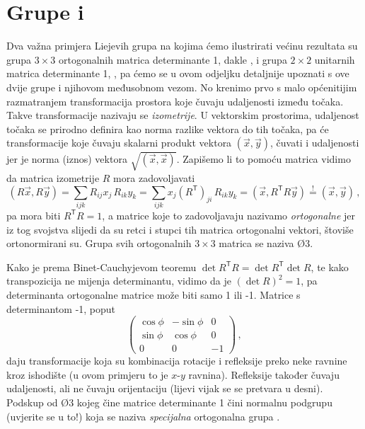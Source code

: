 \section{Grupe  i }
\label{sec:so3su2}

Dva važna primjera Liejevih grupa na kojima  ćemo ilustrirati većinu rezultata
su grupa $3 \times 3$ ortogonalnih matrica determinante 1, dakle ,
i grupa $2 \times 2$ unitarnih matrica determinante 1, , pa ćemo
se u ovom odjeljku detaljnije upoznati s ove dvije grupe i njihovom
međusobnom vezom. No krenimo prvo
s malo općenitijim razmatranjem transformacija prostora koje
čuvaju udaljenosti između točaka.
Takve transformacije nazivaju se \emph{izometrije}. U vektorskim prostorima,
udaljenost točaka se prirodno definira kao norma razlike vektora do tih točaka,
pa će transformacije koje čuvaju skalarni produkt vektora $(\vec{x}, \vec{y})$,
čuvati i udaljenosti jer je norma (iznos) vektora $\sqrt{(\vec{x}, \vec{x})}$.
Zapišemo li to pomoću matrica vidimo da matrica izometrije $R$ mora zadovoljavati
\begin{equation}
    (R\vec{x}, R\vec{y}) = \sum_{ijk} R_{ij}x_{j} \, R_{ik} y_{k} = \sum_{ijk} x_{j} (R^\mathsf{T})_{ji}
    \, R_{ik} y_{k} = (\vec{x}, R^{\mathsf{T}} R \vec{y}) \stackrel{!}{=} (\vec{x}, \vec{y}) \,,
\end{equation}
pa mora biti $R^{\mathsf{T}} R = 1$, a matrice koje to zadovoljavaju
nazivamo \emph{ortogonalne} jer iz tog svojstva slijedi da su retci i stupci
tih matrica ortogonalni vektori, štoviše ortonormirani su. Grupa svih
ortogonalnih $3 \times 3$ matrica se naziva \O{3}.

Kako je prema Binet-Cauchyjevom teoremu $\det R^\mathsf{T} R = \det R^\mathsf{T} \det R$,
te kako transpozicija ne mijenja determinantu, vidimo da je $(\det R)^2 = 1$,
pa determinanta ortogonalne matrice može biti samo 1 ili -1. \label{pag:detO3}
Matrice s determinantom -1, poput 
\begin{equation}
\begin{pmatrix}
\cos\phi & -\sin\phi & 0 \\
\sin\phi & \cos\phi & 0 \\
0 & 0 & -1 \end{pmatrix} \,,
\end{equation}
daju transformacije koja su kombinacija rotacije i refleksije preko
neke ravnine kroz ishodište (u ovom primjeru to je $x$-$y$ ravnina).
Refleksije također čuvaju
udaljenosti, ali ne čuvaju orijentaciju (lijevi vijak se
se pretvara u desni). Podskup od \O{3} kojeg čine
matrice determinante 1 čini normalnu podgrupu (uvjerite se u to!)
koja se naziva \emph{specijalna} ortogonalna grupa .

